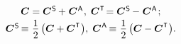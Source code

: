 \nopagebreak\vspace{-0.1em}\begin{equation}\begin{array}{c}
\bm{C} = \bm{C}^{\mathsf{\hspace{.1ex}S}} \hspace{-0.1ex}+\hspace{.1ex} \bm{C}^{\mathsf{\hspace{.1ex}A}}\hspace{.1ex} , \;
\bm{C}^{\hspace{.1ex}\T} \hspace{-0.33ex} = \bm{C}^{\mathsf{\hspace{.1ex}S}} \hspace{-0.1ex}-\hspace{.1ex} \bm{C}^{\mathsf{\hspace{.1ex}A}}
\hspace{.2ex} ;
\\[0.2em]
\bm{C}^{\mathsf{\hspace{.1ex}S}} \hspace{-0.22ex} \equiv \hspace{.1ex} \displaystyle \onehalf \left( {\bm{C} + \bm{C}^{\hspace{.1ex}\T}}\hspace{.1ex} \right)\!, \;
\bm{C}^{\mathsf{\hspace{.1ex}A}} \hspace{-0.22ex} \equiv \hspace{.1ex} \displaystyle \onehalf \left( {\bm{C} - \bm{C}^{\hspace{.1ex}\T}}\hspace{.1ex} \right)\!.
\end{array}\end{equation}

